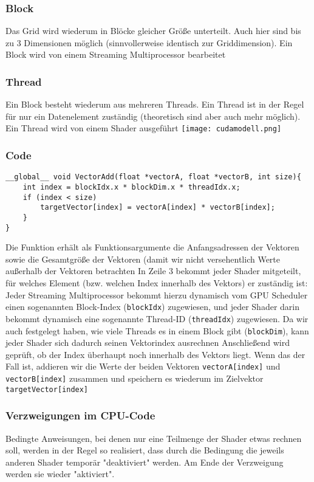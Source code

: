 		\subsubsection{Block}
			Das Grid wird wiederum in Blöcke gleicher Größe unterteilt. Auch hier sind bis zu 3 Dimensionen möglich (sinnvollerweise identisch zur Griddimension). Ein Block wird von einem Streaming Multiprocessor bearbeitet	
		\subsubsection{Thread}
			Ein Block besteht wiederum aus mehreren Threads. Ein Thread ist in der Regel für nur ein Datenelement zuständig (theoretisch sind aber auch mehr möglich). Ein Thread wird von einem Shader ausgeführt \newline
		\texttt{[image: cudamodell.png]}
		\subsubsection{Code}
\begin{verbatim}
__global__ void VectorAdd(float *vectorA, float *vectorB, int size){
	int index = blockIdx.x * blockDim.x * threadIdx.x;
	if (index < size)
		targetVector[index] = vectorA[index] * vectorB[index];	
	}
}
\end{verbatim}
			Die Funktion erhält als Funktionsargumente die Anfangsadressen der Vektoren  sowie die Gesamtgröße der Vektoren (damit wir nicht versehentlich Werte außerhalb der Vektoren betrachten \newline \newline
			In Zeile 3 bekommt jeder Shader mitgeteilt, für welches Element (bzw. welchen Index innerhalb des Vektors) er zuständig ist: Jeder Streaming Multiprocessor bekommt hierzu dynamisch vom GPU Scheduler einen sogenannten Block-Index (\verb|blockIdx|) zugewiesen, und jeder Shader darin bekommt dynamisch eine sogenannte Thread-ID (\verb|threadIdx|) zugewiesen. Da wir auch festgelegt haben, wie viele Threads es in einem Block gibt (\verb|blockDim|), kann jeder Shader sich dadurch seinen Vektorindex ausrechnen \newline \newline
			Anschließend wird geprüft, ob der Index überhaupt noch innerhalb des Vektors liegt. Wenn das der Fall ist, addieren wir die Werte der beiden Vektoren \verb|vectorA[index]| und \verb|vectorB[index]| zusammen und speichern es wiederum im Zielvektor \verb|targetVector[index]| 
		\subsubsection{Verzweigungen im CPU-Code}
			Bedingte Anweisungen, bei denen nur eine Teilmenge der Shader etwas rechnen soll, werden in der Regel so realisiert, dass durch die Bedingung die jeweils anderen Shader temporär "deaktiviert" werden. Am Ende der Verzweigung werden sie wieder "aktiviert".
			
